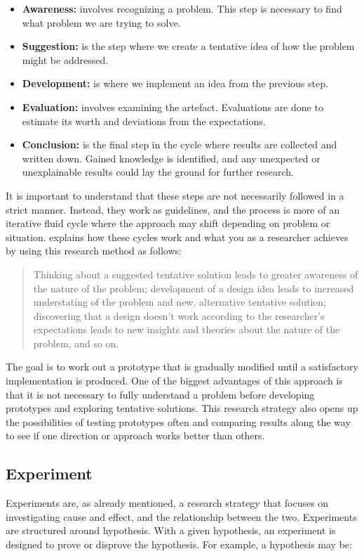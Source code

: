 \begin{itemize}
    \item\textbf{Awareness:} involves recognizing a problem. This step is necessary to find what problem we are trying to solve.
    \item\textbf{Suggestion:} is the step where we create a tentative idea of how the problem might be addressed.
    \item\textbf{Development:} is where we implement an idea from the previous step.
    \item\textbf{Evaluation:} involves examining the artefact. Evaluations are done to estimate its worth and deviations from the expectations.
    \item\textbf{Conclusion:} is the final step in the cycle where results are collected and written down. Gained knowledge is identified, and any unexpected or unexplainable results could lay the ground for further research.
\end{itemize}

It is important to understand that these steps are not necessarily followed in a strict manner. Instead, they work as guidelines, and the process is more of an iterative fluid cycle where the approach may shift depending on problem or situation. \cite{oates2005researching} explains how these cycles work and what you as a researcher achieves by using this research method as follows:

\begin{quote}
    Thinking about a suggested tentative solution leads to greater awareness of the nature of the problem; development of a design idea leads to increased understating of the problem and new, alternative tentative solution; discovering that a design doesn't work according to the researcher's expectations leads to new insights and theories about the nature of the problem, and so on. 
\end{quote}

The goal is to work out a prototype that is gradually modified until a satisfactory implementation is produced. One of the biggest advantages of this approach is that it is not necessary to fully understand a problem before developing prototypes and exploring tentative solutions. This research strategy also opens up the possibilities of testing prototypes often and comparing results along the way to see if one direction or approach works better than others. 

\subsection{Experiment}
\label{sec:experiment}
Experiments are, as already mentioned, a research strategy that focuses on investigating cause and effect, and the relationship between the two. Experiments are structured around hypothesis. With a given hypothesis, an experiment is designed to prove or disprove the hypothesis. For example, a hypothesis may be:

